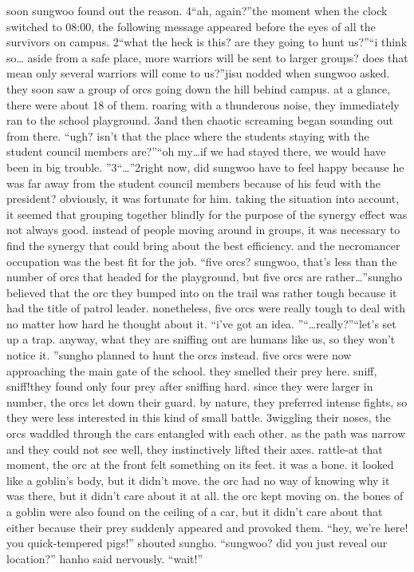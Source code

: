 soon sungwoo found out the reason.
4“ah, again?”the moment when the clock switched to 08:00, the following message appeared before the eyes of all the survivors on campus.
2“what the heck is this? are they going to hunt us?”“i think so… aside from a safe place, more warriors will be sent to larger groups? does that mean only several warriors will come to us?”jisu nodded when sungwoo asked.
they soon saw a group of orcs going down the hill behind campus.
 at a glance, there were about 18 of them.
 roaring with a thunderous noise, they immediately ran to the school playground.
3and then chaotic screaming began sounding out from there.
“ugh? isn’t that the place where the students staying with the student council members are?”“oh my…if we had stayed there, we would have been in big trouble.
”3“…”2right now, did sungwoo have to feel happy because he was far away from the student council members because of his feud with the president? obviously, it was fortunate for him.
taking the situation into account, it seemed that grouping together blindly for the purpose of the synergy effect was not always good.
 instead of people moving around in groups, it was necessary to find the synergy that could bring about the best efficiency.
and the necromancer occupation was the best fit for the job.
“five orcs? sungwoo, that’s less than the number of orcs that headed for the playground, but five orcs are rather…”sungho believed that the orc they bumped into on the trail was rather tough because it had the title of patrol leader.
 nonetheless, five orcs were really tough to deal with no matter how hard he thought about it.
“i’ve got an idea.
”“…really?”“let’s set up a trap.
 anyway, what they are sniffing out are humans like us, so they won’t notice it.
”sungho planned to hunt the orcs instead.
five orcs were now approaching the main gate of the school.
 they smelled their prey here.
sniff, sniff!they found only four prey after sniffing hard.
 since they were larger in number, the orcs let down their guard.
 by nature, they preferred intense fights, so they were less interested in this kind of small battle.
3wiggling their noses, the orcs waddled through the cars entangled with each other.
 as the path was narrow and they could not see well, they instinctively lifted their axes.
rattle-at that moment, the orc at the front felt something on its feet.
it was a bone.
 it looked like a goblin’s body, but it didn’t move.
 the orc had no way of knowing why it was there, but it didn’t care about it at all.
the orc kept moving on.
 the bones of a goblin were also found on the ceiling of a car, but it didn’t care about that either because their prey suddenly appeared and provoked them.
“hey, we’re here! you quick-tempered pigs!” shouted sungho.
“sungwoo? did you just reveal our location?” hanho said nervously.
“wait!”

